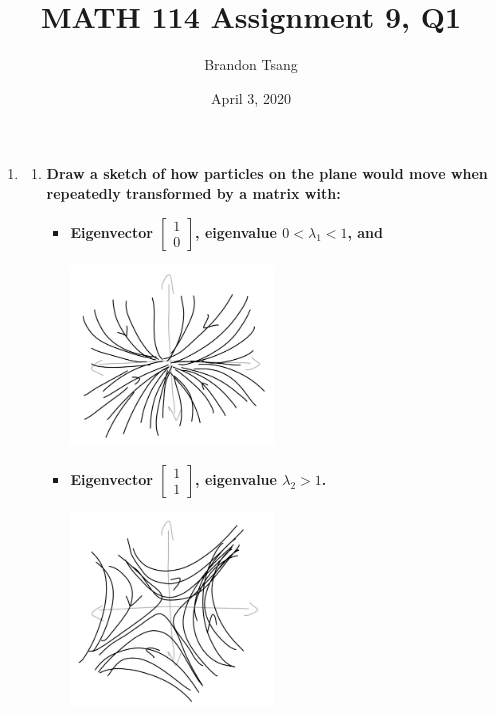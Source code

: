 \documentclass[11pt]{article}
\title{MATH 114 Assignment 9, Q1}
\author{Brandon Tsang}
\date{April 3, 2020}
\begin{document}
    \maketitle
    \begin{enumerate}[label=\textbf{\arabic*.}]
        \item{
            \begin{enumerate}[label=\textbf{(\alph*)}]
                \item{
                    \textbf{Draw a sketch of how particles on the plane would move when repeatedly transformed by a matrix with:}
                    \begin{itemize}
                        \item{
                            \textbf{\boldmath Eigenvector $\begin{bmatrix}1 \\ 0\end{bmatrix}$, eigenvalue $0<\lambda_1<1$, and}
                            \begin{center}
                                \includegraphics[width=0.47\textwidth]{1a1.PNG}
                            \end{center}
                        }
                        \item{
                            \textbf{\boldmath Eigenvector $\begin{bmatrix}1 \\ 1\end{bmatrix}$, eigenvalue $\lambda_2>1$.}
                                \begin{center}
                                    \includegraphics[width=0.47\textwidth]{1a2.PNG}

\end{center}}
\end{itemize}}
\end{enumerate}}
\end{enumerate}
\end{document}
